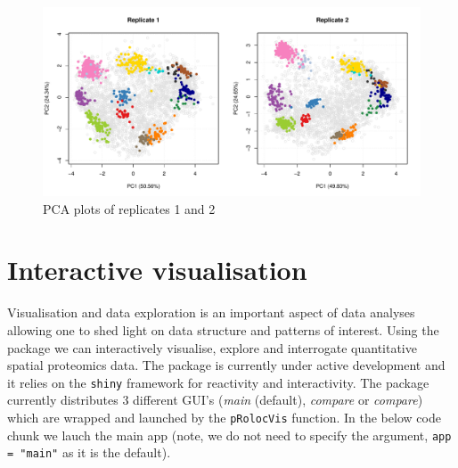 \begin{figure}[!ht]
  \centering
\begin{knitrout}
\color{fgcolor}\begin{kframe}
\begin{alltt}
\hlstd{(} \hlstd{=} \hlstd{(}\hlstd{,} \hlstd{))}
\hlstd{(hl[, hl}\hlopt{$} \hlopt{==} \hlstd{],}  \hlstd{=} \hlstd{)}
\hlstd{(hl[, hl}\hlopt{$} \hlopt{==} \hlstd{],}  \hlstd{=} \hlstd{,}  \hlstd{=} \hlstd{)}
\end{alltt}
\end{kframe}
\includegraphics[width=\textwidth]{figure/plot2Drep-1} 

\end{knitrout}
  \caption{PCA plots of replicates 1 and 2}
  \label{fig:plot2Drep}
\end{figure}

\clearpage

\section*{Interactive visualisation}

Visualisation and data exploration is an important aspect of data
analyses allowing one to shed light on data structure and patterns of
interest. Using the  package we can interactively
visualise, explore and interrogate quantitative spatial proteomics
data. The  package is currently under active
development and it relies on the \texttt{shiny} framework for
reactivity and interactivity. The package currently distributes 3
different GUI's (\textit{main} (default), \textit{compare} or
\textit{compare}) which are wrapped and launched by the
\texttt{pRolocVis} function. In the below code chunk we lauch the main
app (note, we do not need to specify the argument, \texttt{app =
  "main"} as it is the default).

